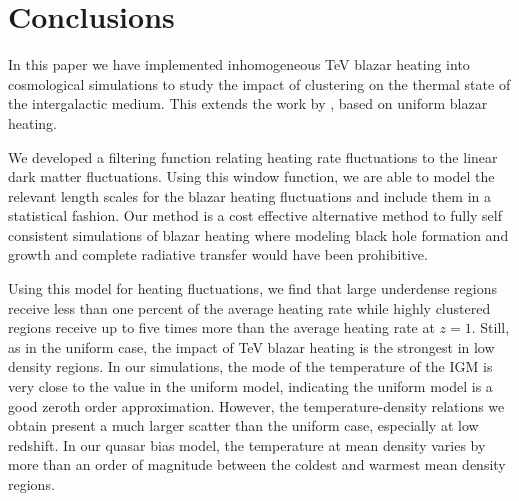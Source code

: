 \documentclass[numberedappendix]{emulateapj}
\begin{document}
{\section{Conclusions}
In this paper we have implemented inhomogeneous TeV blazar heating into cosmological simulations to study the impact of clustering on the thermal state of the intergalactic medium. This extends the work by \citet{2012ApJ...752...23C,2012MNRAS.423..149P}, based on uniform blazar heating.

We developed a filtering function relating heating rate fluctuations to the linear dark matter fluctuations. Using this window function, we are able to model the relevant length scales for the blazar heating fluctuations and include them in a statistical fashion. Our method is a cost effective alternative method to fully self consistent simulations of blazar heating where modeling black hole formation and growth and complete radiative transfer would have been prohibitive.

Using this model for heating fluctuations, we find that large underdense regions receive less than one percent of the average heating rate while highly clustered regions receive up to five times more than the average heating rate at $z=1$. Still, as in the uniform case, the impact of TeV blazar heating is the strongest in low density regions. In our simulations, the mode of the temperature of the IGM is very close to the value in the uniform model, indicating the uniform model is a good zeroth order approximation. However, the temperature-density relations we obtain present a much larger scatter than the uniform case, especially at low redshift. In our quasar bias model, the temperature at mean density varies by more than an order of magnitude between the coldest and warmest mean density regions.

}
\end{document}
